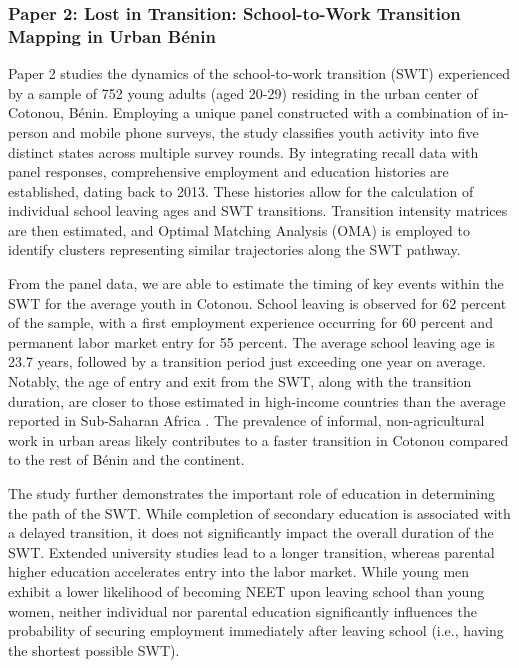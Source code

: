 \documentclass[
  a4paper, twoside, 12pt]{book}
\renewcommand{\hl}[1]{#1}
\begin{document}
\hypertarget{section-7}{%
\subsubsection*{\texorpdfstring{\hl{Paper 2: Lost in Transition: School-to-Work Transition Mapping in Urban Bénin}}{}}\label{section-7}}

\hl{Paper 2 studies the dynamics of the school-to-work transition (SWT) experienced by a sample of 752 young adults (aged 20-29) residing in the urban center of Cotonou, Bénin. Employing a unique panel constructed with a combination of in-person and mobile phone surveys, the study classifies youth activity into five distinct states across multiple survey rounds. By integrating recall data with panel responses, comprehensive employment and education histories are established, dating back to 2013. These histories allow for the calculation of individual school leaving ages and SWT transitions. Transition intensity matrices are then estimated, and Optimal Matching Analysis (OMA) is employed to identify clusters representing similar trajectories along the SWT pathway.}

\hl{From the panel data, we are able to estimate the timing of key events within the SWT for the average youth in Cotonou. School leaving is observed for 62 percent of the sample, with a first employment experience occurring for 60 percent and permanent labor market entry for 55 percent. The average school leaving age is 23.7 years, followed by a transition period just exceeding one year on average. Notably, the age of entry and exit from the SWT, along with the transition duration, are closer to those estimated in high-income countries than the average reported in Sub-Saharan Africa} \autocite{manacorda2017}. \hl{The prevalence of informal, non-agricultural work in urban areas likely contributes to a faster transition in Cotonou compared to the rest of Bénin and the continent.}

\hl{The study further demonstrates the important role of education in determining the path of the SWT. While completion of secondary education is associated with a delayed transition, it does not significantly impact the overall duration of the SWT. Extended university studies lead to a longer transition, whereas parental higher education accelerates entry into the labor market. While young men exhibit a lower likelihood of becoming NEET upon leaving school than young women, neither individual nor parental education significantly influences the probability of securing employment immediately after leaving school (i.e., having the shortest possible SWT).}
\end{document}
